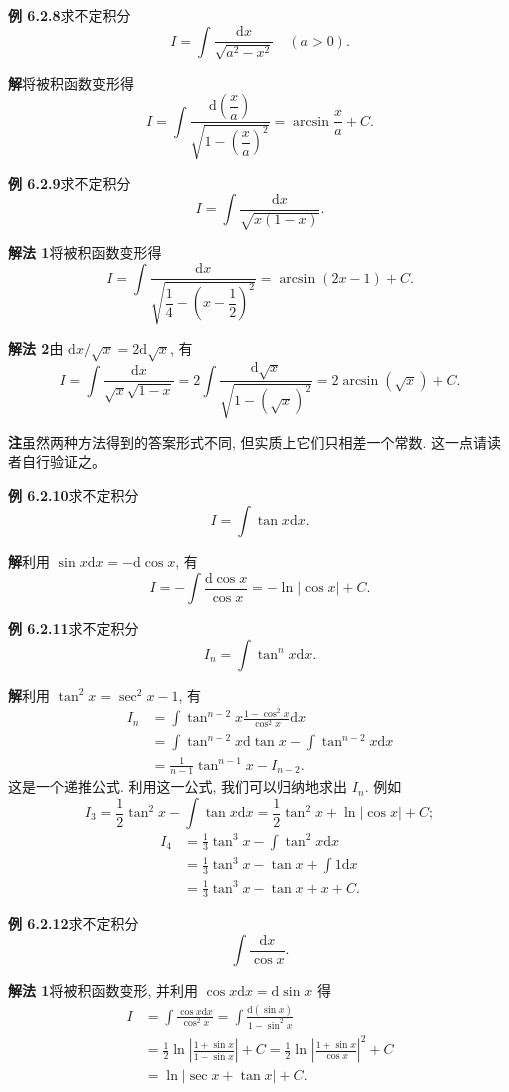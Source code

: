 \documentclass[UTF8, 12pt, fontset=fandol, oneside]{ctexart}
\begin{document}
\noindent\textbf{例 6.2.8}\quad 求不定积分
\[
  I=\int\frac{\mathrm dx}{\sqrt{a^2-x^2}}\quad (a>0).
\]

\noindent\textbf{解}\quad 将被积函数变形得
\[
  I=
  \int\frac{\mathrm d\left(\dfrac xa\right)}
  {\sqrt{1-\left(\dfrac xa\right)^2}}
  =
  \arcsin\frac xa+C.
\]

\noindent\textbf{例 6.2.9}\quad 求不定积分
\[
  I=\int\frac{\mathrm dx}{\sqrt{x(1-x)}}.
\]

\noindent\textbf{解法 1}\quad 将被积函数变形得
\[
  I=
  \int\frac{\mathrm dx}{\sqrt{\dfrac14-\left(x-\dfrac12\right)^2}}
  =
  \arcsin(2x-1)+C.
\]

\noindent\textbf{解法 2}\quad 由 $\mathrm dx/\sqrt x=2\mathrm d\sqrt x$, 有
\[
  I=
  \int\frac{\mathrm dx}{\sqrt x\sqrt{1-x}}
  =
  2\int\frac{\mathrm d\sqrt x}{\sqrt{1-(\sqrt x)^2}}
  =
  2\arcsin(\sqrt x)+C.
\]

\noindent\textbf{注}\quad 虽然两种方法得到的答案形式不同, 但实质上它们只相差一个常数. 这一点请读者自行验证之。

\noindent\textbf{例 6.2.10}\quad 求不定积分
\[
  I=\int\tan x\mathrm dx.
\]

\noindent\textbf{解}\quad 利用 $\sin x\mathrm dx=-\mathrm d\cos x$, 有
\[
  I=-\int\frac{\mathrm d\cos x}{\cos x}
  =
  -\ln|\cos x|+C.
\]

\noindent\textbf{例 6.2.11}\quad 求不定积分
\[
  I_n=\int\tan^nx\mathrm dx.
\]

\noindent\textbf{解}\quad 利用 $\tan^2x=\sec^2x-1$, 有
\[
\begin{aligned}
  I_n
  &=
  \int\tan^{n-2}x\frac{1-\cos^2x}{\cos^2x}\mathrm dx\\
  &=
  \int\tan^{n-2}x\mathrm d\tan x-\int\tan^{n-2}x\mathrm dx\\
  &=
  \frac1{n-1}\tan^{n-1}x-I_{n-2}.
\end{aligned}
\]
这是一个递推公式. 利用这一公式, 我们可以归纳地求出 $I_n$. 例如
\[
  I_3=\frac12\tan^2x-\int\tan x\mathrm dx
  =
  \frac12\tan^2x+\ln|\cos x|+C;
\]
\[
\begin{aligned}
  I_4
  &=
  \frac13\tan^3x-\int\tan^2x\mathrm dx\\
  &=
  \frac13\tan^3x-\tan x+\int1\mathrm dx\\
  &=
  \frac13\tan^3x-\tan x+x+C.
\end{aligned}
\]

\noindent\textbf{例 6.2.12}\quad 求不定积分
\[
  \int\frac{\mathrm dx}{\cos x}.
\]

\noindent\textbf{解法 1}\quad 将被积函数变形, 并利用 $\cos x\mathrm dx=\mathrm d\sin x$ 得
\[
\begin{aligned}
  I
  &=
  \int\frac{\cos x\mathrm dx}{\cos^2x}
  =
  \int\frac{\mathrm d(\sin x)}{1-\sin^2x}\\
  &=
  \frac12\ln\left|\frac{1+\sin x}{1-\sin x}\right|+C
  =
  \frac12\ln\left|\frac{1+\sin x}{\cos x}\right|^2+C\\
  &=
  \ln|\sec x+\tan x|+C.
\end{aligned}
\]
\end{document}
